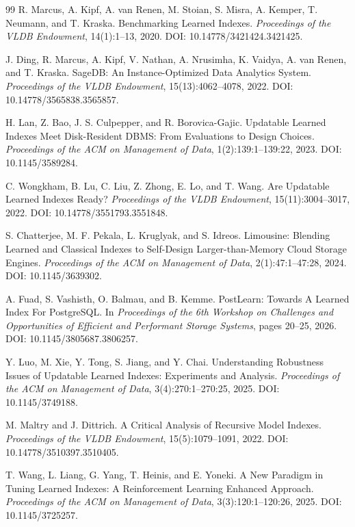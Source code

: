 \documentclass[a4paper, 12pt, twoside]{report}
\begin{document}
\begin{thebibliography}{99}
   R. Marcus, A. Kipf, A. van Renen, M. Stoian, S. Misra, A. Kemper, T. Neumann, and T. Kraska.
   Benchmarking Learned Indexes.
   \textit{Proceedings of the VLDB Endowment}, 14(1):1--13, 2020.
   DOI: 10.14778/3421424.3421425.

   J. Ding, R. Marcus, A. Kipf, V. Nathan, A. Nrusimha, K. Vaidya, A. van Renen, and T. Kraska.
   SageDB: An Instance-Optimized Data Analytics System.
   \textit{Proceedings of the VLDB Endowment}, 15(13):4062--4078, 2022.
   DOI: 10.14778/3565838.3565857.

   H. Lan, Z. Bao, J. S. Culpepper, and R. Borovica-Gajic.
   Updatable Learned Indexes Meet Disk-Resident DBMS: From Evaluations to Design Choices.
   \textit{Proceedings of the ACM on Management of Data}, 1(2):139:1--139:22, 2023.
   DOI: 10.1145/3589284.

   C. Wongkham, B. Lu, C. Liu, Z. Zhong, E. Lo, and T. Wang.
   Are Updatable Learned Indexes Ready?
   \textit{Proceedings of the VLDB Endowment}, 15(11):3004--3017, 2022.
   DOI: 10.14778/3551793.3551848.

   S. Chatterjee, M. F. Pekala, L. Kruglyak, and S. Idreos.
   Limousine: Blending Learned and Classical Indexes to Self-Design Larger-than-Memory Cloud Storage Engines.
   \textit{Proceedings of the ACM on Management of Data}, 2(1):47:1--47:28, 2024.
   DOI: 10.1145/3639302.

   A. Fuad, S. Vashisth, O. Balmau, and B. Kemme.
   PostLearn: Towards A Learned Index For PostgreSQL.
   In \textit{Proceedings of the 6th Workshop on Challenges and Opportunities of Efficient and Performant Storage Systems}, pages 20--25, 2026.
   DOI: 10.1145/3805687.3806257.

   Y. Luo, M. Xie, Y. Tong, S. Jiang, and Y. Chai.
   Understanding Robustness Issues of Updatable Learned Indexes: Experiments and Analysis.
   \textit{Proceedings of the ACM on Management of Data}, 3(4):270:1--270:25, 2025.
   DOI: 10.1145/3749188.

   M. Maltry and J. Dittrich.
   A Critical Analysis of Recursive Model Indexes.
   \textit{Proceedings of the VLDB Endowment}, 15(5):1079--1091, 2022.
   DOI: 10.14778/3510397.3510405.

   T. Wang, L. Liang, G. Yang, T. Heinis, and E. Yoneki.
   A New Paradigm in Tuning Learned Indexes: A Reinforcement Learning Enhanced Approach.
   \textit{Proceedings of the ACM on Management of Data}, 3(3):120:1--120:26, 2025.
   DOI: 10.1145/3725257.


\end{thebibliography}
\end{document}
